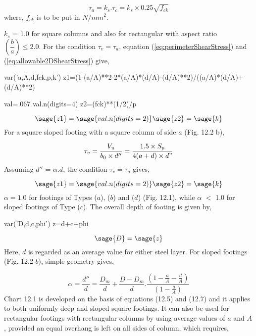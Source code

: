 \begin{equation}
\label{eq:allowable2DShearStress}
\tau_{a} = k_{s} . \tau_{c} = k_{s} \times 0.25 \sqrt{f_{ck}}
\end{equation}
where, $f_{ck}$ is to be put in $N/mm^2$.

$k_{s}$ = 1.0 for square columns and also for rectangular with aspect ratio
$\left( \dfrac{b}{a} \right) \leq {2.0}$. For the condition $\tau_{v} =
\tau_{a}$, equation (\ref{eq:perimeterShearStress}) and
(\ref{eq:allowable2DShearStress}) give,

\begin{sagesilent}
  var('a,A,d,fck,p,k')
  z1=(1-(a/A)**2-2*(a/A)*(d/A)-(d/A)**2)/((a/A)*(d/A)+(d/A)**2)
  
  val=.067
  val.n(digits=4)
  z2=(fck)**(1/2)/p
\end{sagesilent}

\begin{equation}
  \sage{z1}= \sage{val.n(digits=2)}\sage{z2}=\sage{k}
\end{equation}
For a square sloped footing with a square column of side $a$ (Fig. 12.2 b),
 
\begin{equation}
\label{eq:(1.5)}
\tau_{v} = \frac{V_{u}}{b_{0} \times d''}
=\frac{1.5 \times {S_p}}{4(a + d) \times d"}
\end{equation}
Assuming $d''$ = $ \alpha . d $, the condition $\tau_{v} = \tau_{a}$ gives,

\begin{equation}    
 \sage{z1}=\sage{val.n(digits=2)}\sage{z2}=\sage{k}   
\end{equation}  
$\alpha = 1.0$ for footings of Types ($a$), ($b$) and ($d$) (Fig. 12.1),
while $\alpha$ $<$ 1.0 for sloped footings of Type ($c$). The overall depth
of footing is given by,

\begin{sagesilent}
  var('D,d,c,phi')
  z=d+c+phi
\end{sagesilent}

\begin{equation}
  \label{eq:(1.8)}
  \sage{D}=\sage{z}
\end{equation}
Here, $d$ is regarded as an average value for either steel layer. For sloped
footings (Fig.  12.2 $b$), simple geometry gives,

\begin{equation}
\label{eq:(1.9)}
\alpha = \frac{d''}{d} = \frac{{D_m}}{d} + \frac{D - {D_m}}{d}.
\frac{\left(1 - \frac{a}{A} - \frac{d}{A}\right)}
{\left(1 - \frac{a}{A}\right)}
\end{equation}
Chart 12.1 is developed on the basis of equations (12.5) and (12.7) and it
applies to both uniformly deep and sloped square footings. It can also be
used for rectangular footings with rectangular columns by using average
values of $a$ and $A$, provided an equal overhang is left on all sides of
column, which requires,

